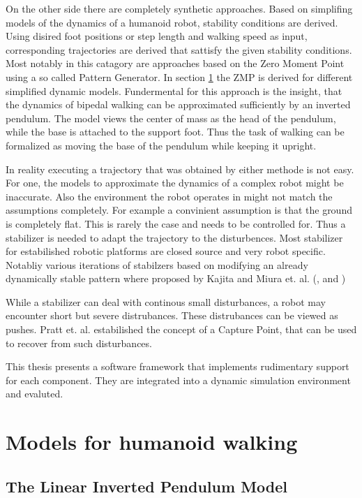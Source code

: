 \documentclass[english,ngerman]{KITreprt}
\begin{document}
On the other side there are completely synthetic approaches. Based on
simplifing models of the dynamics of a humanoid robot, stability
conditions are derived. Using disired foot positions or step length and
walking speed as input, corresponding trajectories are derived that
sattisfy the given stability conditions. Most notably in this catagory
are approaches based on the Zero Moment Point using a so called Pattern
Generator. In section \ref{section:walking-models} the ZMP is derived
for different simplified dynamic models. Fundermental for this approach
is the insight, that the dynamics of bipedal walking can be approximated
sufficiently by an inverted pendulum. The model views the center of mass
as the head of the pendulum, while the base is attached to the support
foot. Thus the task of walking can be formalized as moving the base of
the pendulum while keeping it upright.

In reality executing a trajectory that was obtained by either methode is
not easy. For one, the models to approximate the dynamics of a complex
robot might be inaccurate. Also the environment the robot operates in
might not match the assumptions completely. For example a convinient
assumption is that the ground is completely flat. This is rarely the
case and needs to be controlled for. Thus a stabilizer is needed to
adapt the trajectory to the disturbences. Most stabilizer for
estabilished robotic platforms are closed source and very robot
specific. Notabliy various iterations of stabilzers based on modifying
an already dynamically stable pattern where proposed by Kajita and Miura
et. al. (\cite{kajita2010biped}, \cite{miura2011human} and
\cite{kajita2012evaluation})

While a stabilizer can deal with continous small disturbances, a robot
may encounter short but severe distrubances. These distrubances can be
viewed as pushes. Pratt et. al. estabilished the concept of a Capture
Point, that can be used to recover from such disturbances.

This thesis presents a software framework that implements rudimentary
support for each component. They are integrated into a dynamic
simulation environment and evaluted.

\chapter{Models for humanoid walking}\label{section:walking-models}

\section{The Linear Inverted Pendulum
Model}\label{the-linear-inverted-pendulum-model}
\end{document}
